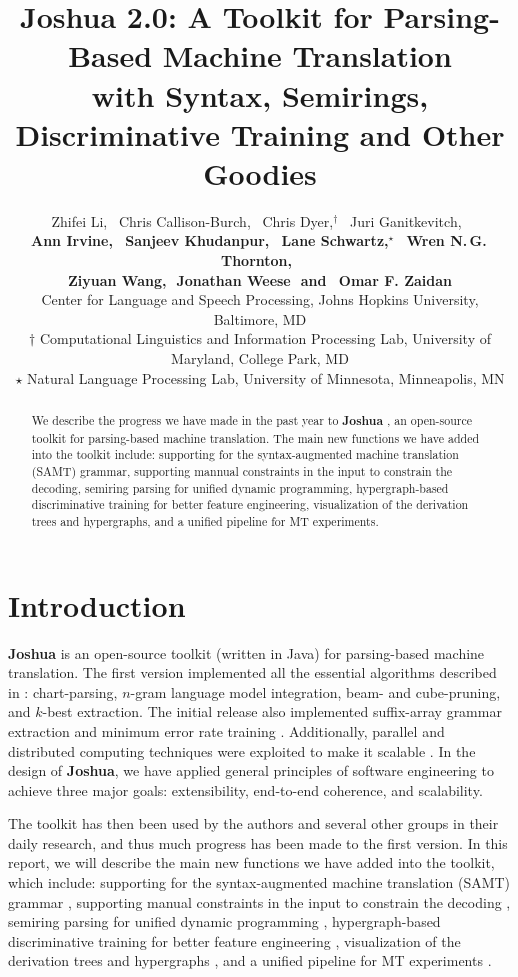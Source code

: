 \documentclass[11pt]{article}
\title{Joshua 2.0: A Toolkit for Parsing-Based Machine Translation \\with Syntax, Semirings, Discriminative Training and Other Goodies }
\author{
Zhifei Li,\,\,\,
Chris Callison-Burch,\,\,\,
Chris Dyer,$^\dagger$\,\,\,
Juri Ganitkevitch,\,\,\,
\\ {\bf
Ann Irvine,\,\,\,  
Sanjeev Khudanpur,\,\,\,
Lane Schwartz,$^\star$\,\,\, 
Wren N.\,G.\,Thornton,\,\,\,}
\\ {\bf
Ziyuan Wang,\,\,
Jonathan Weese\,\,
{\textnormal{and}}
\,\,\,Omar F. Zaidan
}\\
Center for Language and Speech Processing, Johns Hopkins University, Baltimore, MD\\
$\dagger$ Computational Linguistics and Information Processing Lab, University of Maryland, College Park, MD\\
$\star$ Natural Language Processing Lab, University of Minnesota, Minneapolis, MN }
\date{}
\newcommand{\joshua}{\textbf{Joshua}}
\begin{document}
\maketitle
\begin{abstract}
We describe the progress we have made in the past year to \textbf{Joshua} \cite{joshua-wmt09}, 
an open-source toolkit for parsing-based machine translation.
The main new functions we have added into the toolkit include: supporting for the syntax-augmented machine translation (SAMT) grammar,
supporting mannual constraints in the input to constrain the decoding,  
semiring parsing for unified dynamic programming, hypergraph-based 
discriminative training for better feature engineering, visualization of the derivation
trees and hypergraphs, and a unified pipeline for MT experiments.
\end{abstract}


\listoftodos

\section{Introduction}

\textbf{Joshua} \cite{joshua-wmt09} is an open-source toolkit (written in Java) for parsing-based machine translation.
The first version implemented all the essential algorithms described 
in : chart-parsing, $n$-gram language model integration, beam- and cube-pruning, and $k$-best extraction.  
The initial release also implemented suffix-array grammar extraction \cite{lopez:2007:EMNLP-CoNLL2007} 
and minimum error rate training \cite{och-mert}. 
Additionally, parallel and distributed computing techniques were exploited 
to make it scalable \cite{Joshua-old}. In the design of \joshua, we have applied general
principles of software engineering to achieve three
major goals: extensibility, end-to-end coherence,
and scalability.

The toolkit has then been used by the authors and several
other groups in their daily research, and thus much progress has
been made to the first version. 
In this report, we will describe the main new functions we have added into the 
toolkit, which include: supporting for the syntax-augmented machine translation (SAMT) grammar \cite{samt2006},
supporting manual constraints in the input to constrain the decoding \cite{PBML-2010-Josua-transliteration},  
semiring parsing for unified dynamic programming \cite{li-eisner:2009:EMNLP}, 
hypergraph-based discriminative training for better feature engineering \cite{oracle-extraction-naacl09}, 
visualization of the derivation trees and hypergraphs \cite{PBML-2010-Josua-visualization}, 
and a unified pipeline for MT experiments \cite{Schwartz-wmt10-pipline}.
\end{document}
